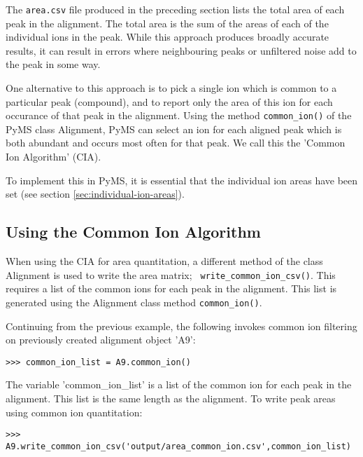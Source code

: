 The {\tt area.csv} file produced in the preceding section lists the
total area of each peak in the alignment. The total area is the sum of
the areas of each of the individual ions in the peak. While this approach
produces broadly accurate results, it can result in errors where
neighbouring peaks or unfiltered noise add to the peak in some way.

One alternative to this approach is to pick a single ion which is
common to a particular peak (compound), and to report only the area of this ion
for each occurance of that peak in the alignment. Using the method
{\tt common\_ion()} of the PyMS class Alignment, PyMS can select an ion for
each aligned peak which is both abundant and occurs most often 
for that peak. We call this the 'Common Ion Algorithm' (CIA).

To implement this in PyMS, it is essential that the individual ion
areas have been set (see section \ref{sec:individual-ion-areas}).


\subsection{Using the Common Ion Algorithm}
When using the CIA for area quantitation, a different method of the
class Alignment is used to write the area matrix; {\tt
  write\_common\_ion\_csv()}. This requires a list of the common ions
for each peak in the alignment. This list is generated using the
Alignment class method {\tt common\_ion()}.

Continuing from the previous example, the following invokes common ion
filtering on previously created alignment object 'A9':
\begin{verbatim}
>>> common_ion_list = A9.common_ion()
\end{verbatim}

The variable 'common\_ion\_list' is a list of the common ion for each
peak in the alignment. This list is the same length as the
alignment. To write peak areas using common ion quantitation:

\begin{verbatim} 
>>> A9.write_common_ion_csv('output/area_common_ion.csv',common_ion_list)
\end{verbatim}
